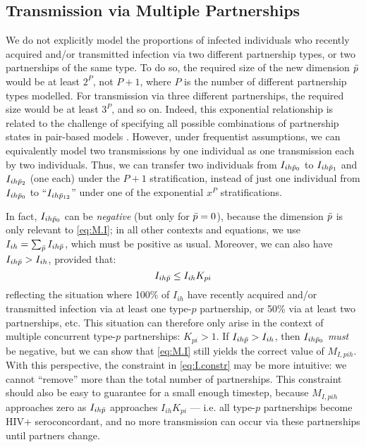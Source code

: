 \subsection{Transmission via Multiple Partnerships}\label{mod.foi.mp}
We do not explicitly model the proportions of infected individuals
who recently acquired and/or transmitted infection via
two different partnership types, or two partnerships of the same type.
To do so, the required size of the new dimension $\bar{p}$ would be at least $2^{P}$, not $P+1$,
where $P$ is the number of different partnership types modelled.
For transmission via three different partnerships,
the required size would be at least $3^{P}$, and so on.
Indeed, this exponential relationship is related to the challenge of specifying
all possible combinations of partnership states in pair-based models \cite{Kretzschmar2017}.
However, under frequentist assumptions, we can equivalently model
two transmissions by one individual as one transmission each by two individuals.
Thus, we can transfer two individuals from $I_{ih\bar{p}_0}$ to
$I_{ih\bar{p}_1}$ and $I_{ih\bar{p}_2}$ (one each) under the $P+1$ stratification,
instead of just one individual from $I_{ih\bar{p}_0}$ to
``$I_{ih\bar{p}_{12}}$'' under one of the exponential $x^P$ stratifications.
\par
In fact, $I_{ih\bar{p}_0}$ can be \emph{negative} (but only for $\bar{p} = 0$),
because the dimension $\bar{p}$ is only relevant to \eqref{eq:M.I};
in all other contexts and equations,
we use $I_{ih} = \sum_{\bar{p}} I_{ih\bar{p}}$, which must be positive as usual.
Moreover, we can also have $I_{ih\bar{p}} > I_{ih}$, provided that:
\begin{equation}\label{eq:I.constr}
  I_{ih\bar{p}} \le I_{ih} K_{pi}
\end{equation}
reflecting the situation where 100\% of $I_{ih}$
have recently acquired and/or transmitted infection via at least one type-$p$ partnership,
or 50\% via at least two partnerships, etc.
This situation can therefore only arise in the context of
multiple concurrent type-$p$ partnerships: $K_{pi} > 1$.
If $I_{ih\bar{p}} > I_{ih}$, then $I_{ih\bar{p}_0}$ \emph{must} be negative,
but we can show that \eqref{eq:M.I} still yields the correct value of $M_{I,pih}$.
With this perspective, the constraint in \eqref{eq:I.constr} may be more intuitive:
we cannot ``remove'' more than the total number of partnerships.
This constraint should also be easy to guarantee for a small enough timestep,
because $M_{I,pih}$ approaches zero as $I_{ih\bar{p}}$ approaches $I_{ih} K_{pi}$
--- i.e. all type-$p$ partnerships become HIV+ seroconcordant,
and no more transmission can occur via these partnerships until partners change.
